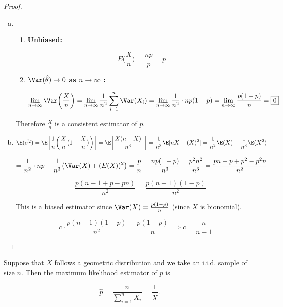 \begin{proof}
\begin{enumerate}[a.]
\item \begin{enumerate}[(1)]

\item \textbf{Unbiased:} 

\[
E\bigg( \frac{X}{n} \bigg) = \frac{np}{p} = p
\]

\item \textbf{\(\Var(\hat{\theta}) \to 0\)  as \( n \to \infty\) :}

\[
\lim_{n \to \infty} \Var\bigg( \frac{X}{n} \bigg)  = \lim_{n \to \infty} \frac{1}{n^2} \sum_{i=1}^n \Var(X_i) = \lim_{n \to \infty} \frac{1}{n^2}\cdot n p (1-p) = \lim_{n \to \infty} \frac{p(1-p)}{n} = \boxed{0}
\]

\end{enumerate}

Therefore \(\frac{X}{n} \) is a consistent estimator of \(p\).

\item \[
\E (\hat{\sigma^2}) = \E \bigg[ \frac{1}{n} \bigg( \frac{X}{n} \big( 1 - \frac{X}{n} \big) \bigg) \bigg] = \E \bigg[   \frac{X (n - X)}{n^3}  \ \bigg] = \frac{1}{n^3} \E[nX - (X)^2]  = \frac{1}{n^2} \E(X) - \frac{1}{n^3} \E(X^2)
\]

\[
= \frac{1}{n^2} \cdot np - \frac{1}{n^3}\big( \Var(X) + (E(X))^2 \big) = \frac{p}{n} - \frac{np(1-p)}{n^3} - \frac{p^2n^2}{n^3} = \frac{pn - p + p^2 - p^2n}{n^2}
\]

\[
= \frac{p(n - 1 + p - pn)}{n^2} = \frac{p(n-1)(1-p)}{n^2}
\]

This is a biased estimator since \( \Var(X) = \frac{p(1-p)}{n}\) (since \(X\) is bionomial).

\[
c \cdot \frac{p(n-1)(1-p)}{n^2} =  \frac{p(1-p)}{n} \implies \boxed{c = \frac{n}{n-1}}
\]

\end{enumerate}

\end{proof}

\begin{proposition} Suppose that \(X\) follows a geometric distribution and we take an i.i.d. sample of size \(n\). Then the maximum likelihood estimator of \(p\) is 

\[
\hat{p} = \frac{n}{\sum_{i=1}^n X_i} = \frac{1}{\bar{X}}.
\]

\end{proposition}

